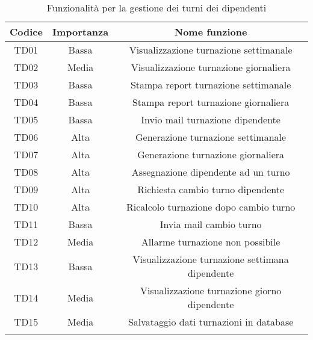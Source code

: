 \setlength{\extrarowheight}{7pt}
\begin{longtable}{|c|c|c|}
\hline 
\textbf{Codice} & \textbf{Importanza} & \textbf{Nome funzione}
\tabularnewline
\hline
TD01 &  Bassa &	Visualizzazione turnazione settimanale\tabularnewline
TD02 &	Media &	Visualizzazione turnazione giornaliera\tabularnewline
TD03 &	Bassa &	Stampa report turnazione settimanale\tabularnewline
TD04 &	Bassa &	Stampa report turnazione giornaliera\tabularnewline
TD05 &	Bassa &	Invio mail turnazione dipendente\tabularnewline
TD06 &	Alta	 &	Generazione turnazione settimanale\tabularnewline
TD07 &	Alta	 &	Generazione turnazione giornaliera\tabularnewline
TD08 &	Alta	 &	Assegnazione dipendente ad un turno\tabularnewline
TD09 &	Alta	 &  Richiesta cambio turno dipendente\tabularnewline
TD10 &	Alta	 &	Ricalcolo turnazione dopo cambio turno\tabularnewline
TD11 &	Bassa &	Invia mail cambio turno\tabularnewline
TD12 &	Media &	Allarme turnazione non possibile\tabularnewline
TD13 &  Bassa &	Visualizzazione turnazione settimana dipendente\tabularnewline
TD14 &	Media &	Visualizzazione turnazione giorno dipendente\tabularnewline
TD15 & 	Media & Salvataggio dati turnazioni in database\tabularnewline
\hline
\caption{Funzionalità per la gestione dei turni dei dipendenti}
\label{tab:GestioneTurniDipendenti}
\end{longtable}